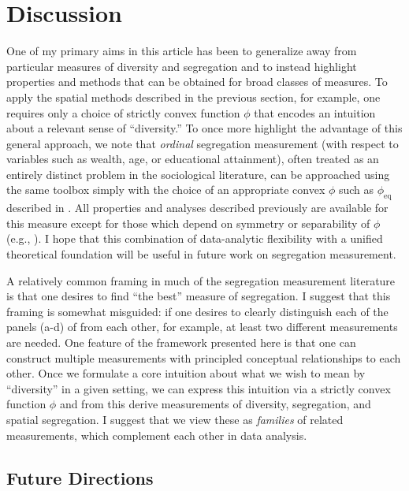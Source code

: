 \section{Discussion} \label{sec:discussion}

  One of my primary aims in this article has been to generalize away from particular measures of diversity and segregation and to instead highlight properties and methods that can be obtained for broad classes of measures. 
  To apply the spatial methods described in the previous section, for example, one requires only a choice of strictly convex function $\phi$ that encodes an intuition about a relevant sense of ``diversity.'' 
  To once more highlight the advantage of this general approach, we note that \emph{ordinal} segregation measurement (with respect to variables such as wealth, age, or educational attainment), often treated as an entirely distinct problem in the sociological literature, can be approached using the same toolbox simply with the choice of an appropriate convex $\phi$ such as $\phi_{\mathrm{eq}}$ described in .
  All properties and analyses described previously are available for this measure except for those which depend on symmetry or separability of $\phi$ (e.g., ).
  I hope that this combination of data-analytic flexibility with a unified theoretical foundation will be useful in future work on segregation measurement. 
  
  A relatively common framing in much of the segregation measurement literature is that one desires to find ``the best'' measure of segregation. 
  I suggest that this framing is somewhat misguided: if one desires to clearly distinguish each of the panels (a-d) of  from each other, for example, at least two different measurements are needed. 
  One feature of the framework presented here is that one can construct multiple measurements with principled conceptual relationships to each other. 
  Once we formulate a core intuition about what we wish to mean by ``diversity'' in a given setting, we can express this intuition via a strictly convex function $\phi$ and from this derive measurements of diversity, segregation, and spatial segregation. 
  I suggest that we view these as \emph{families} of related measurements, which complement each other in data analysis. 

  \subsection*{Future Directions}

